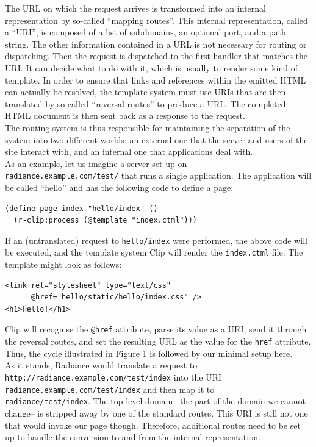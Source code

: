 \documentclass{sig-alternate}
\begin{document}
The URL on which the request arrives is transformed into an internal representation by so-called ``mapping routes''. This internal representation, called a ``URI'', is composed of a list of subdomains, an optional port, and a path string. The other information contained in a URL is not necessary for routing or dispatching. Then the request is dispatched to the first handler that matches the URI. It can decide what to do with it, which is usually to render some kind of template. In order to ensure that links and references within the emitted HTML can actually be resolved, the template system must use URIs that are then translated by so-called ``reversal routes'' to produce a URL. The completed HTML document is then sent back as a response to the request. \\

The routing system is thus responsible for maintaining the separation of the system into two different worlds: an external one that the server and users of the site interact with, and an internal one that applications deal with. \\

As an example, let us imagine a server set up on \\ \texttt{radiance.example.com/test/} that runs a single application. The application will be called ``hello'' and has the following code to define a page:

\begin{verbatim}
(define-page index "hello/index" ()
  (r-clip:process (@template "index.ctml")))
\end{verbatim}

If an (untranslated) request to \texttt{hello/index} were performed, the above code will be executed, and the template system Clip\cite{clip} will render the \texttt{index.ctml} file. The template might look as follows:

\begin{verbatim}
<link rel="stylesheet" type="text/css"
      @href="hello/static/hello/index.css" />
<h1>Hello!</h1>
\end{verbatim}

Clip will recognise the \texttt{@href} attribute, parse its value as a URI, send it through the reversal routes, and set the resulting URL as the value for the \texttt{href} attribute. Thus, the cycle illustrated in Figure 1 is followed by our minimal setup here. \\

As it stands, Radiance would translate a request to \\\texttt{http://radiance.example.com/test/index} into the URI \\\texttt{radiance.example.com/test/index} and then map it to \\\texttt{radiance/test/index}. The top-level domain --the part of the domain we cannot change-- is stripped away by one of the standard routes. This URI is still not one that would invoke our page though. Therefore, additional routes need to be set up to handle the conversion to and from the internal representation.
\end{document}
